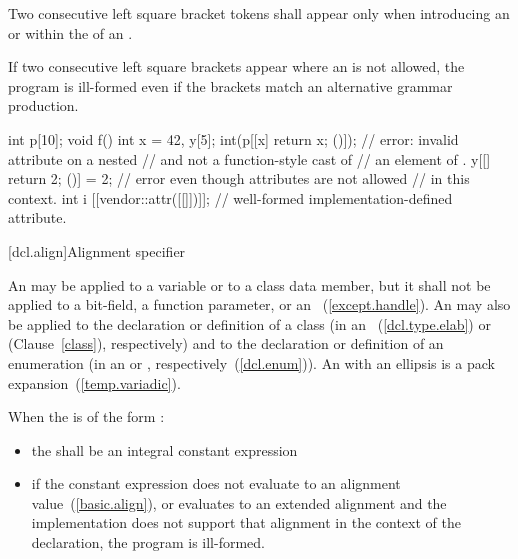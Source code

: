 \pnum
Two consecutive left square bracket tokens shall appear only
when introducing an  or
within the  of
an .
\begin{note} If two consecutive left square brackets appear
where an  is not allowed, the program is ill-formed even
if the brackets match an alternative grammar production. \end{note} \begin{example}
\begin{codeblock}
int p[10];
void f() {
  int x = 42, y[5];
  int(p[[x] { return x; }()]);  // error: invalid attribute on a nested
                                //  and not a function-style cast of
                                // an element of .
  y[[] { return 2; }()] = 2;    // error even though attributes are not allowed
                                // in this context.
  int i [[vendor::attr([[]])]]; // well-formed implementation-defined attribute.
}
\end{codeblock}
\end{example}

[dcl.align]{Alignment specifier}%

\pnum
An 
may be applied to a variable
or to a class data member, but it shall not be applied to a bit-field, a function
parameter, or an ~(\ref{except.handle}).
An  may also be applied to the declaration or
definition of a class (in an
~(\ref{dcl.type.elab}) or
 (Clause~\ref{class}), respectively) and to the
declaration or definition of an enumeration (in an
 or ,
respectively~(\ref{dcl.enum})).
An  with an ellipsis is a pack expansion~(\ref{temp.variadic}).

\pnum
When the  is of the form
  \tcode{)}:

\begin{itemize}
\item the  shall be an integral constant expression

\item if the constant expression does not evaluate to an alignment
value~(\ref{basic.align}), or evaluates to an extended alignment and
the implementation does not support that alignment in the context of the
declaration, the program is ill-formed.
\end{itemize}

